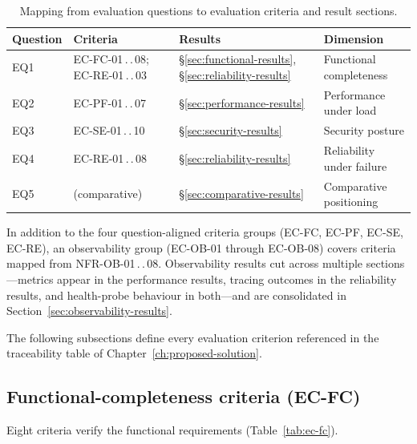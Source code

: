 \documentclass[a4paper,noexaminfo]{sapthesis}
\begin{document}
\begin{table}[ht]
\centering
\caption{Mapping from evaluation questions to evaluation criteria and
result sections.}
\label{tab:eq-mapping}
\small
\begin{tabularx}{\textwidth}{@{}l l l X@{}}
    \hline
    \textbf{Question} & \textbf{Criteria} & \textbf{Results} &
        \textbf{Dimension} \\
    \hline
    EQ1 & EC-FC-01\,.\,.\,08; EC-RE-01\,.\,.\,03 &
        \S\ref{sec:functional-results}, \S\ref{sec:reliability-results} &
        Functional completeness \\
    EQ2 & EC-PF-01\,.\,.\,07 &
        \S\ref{sec:performance-results} &
        Performance under load \\
    EQ3 & EC-SE-01\,.\,.\,10 &
        \S\ref{sec:security-results} &
        Security posture \\
    EQ4 & EC-RE-01\,.\,.\,08 &
        \S\ref{sec:reliability-results} &
        Reliability under failure \\
    EQ5 & (comparative) &
        \S\ref{sec:comparative-results} &
        Comparative positioning \\
    \hline
\end{tabularx}
\end{table}

In addition to the four question-aligned criteria groups
(EC-FC, EC-PF, EC-SE, EC-RE), an observability group
(EC-OB-01 through EC-OB-08) covers criteria mapped from
NFR-OB-01\,.\,.\,08.  Observability results cut across multiple
sections---metrics appear in the performance results, tracing outcomes in
the reliability results, and health-probe behaviour in both---and are
consolidated in Section~\ref{sec:observability-results}.

The following subsections define every evaluation criterion referenced
in the traceability table of Chapter~\ref{ch:proposed-solution}.

\subsection{Functional-completeness criteria (EC-FC)}

Eight criteria verify the functional requirements
(Table~\ref{tab:ec-fc}).
\end{document}
